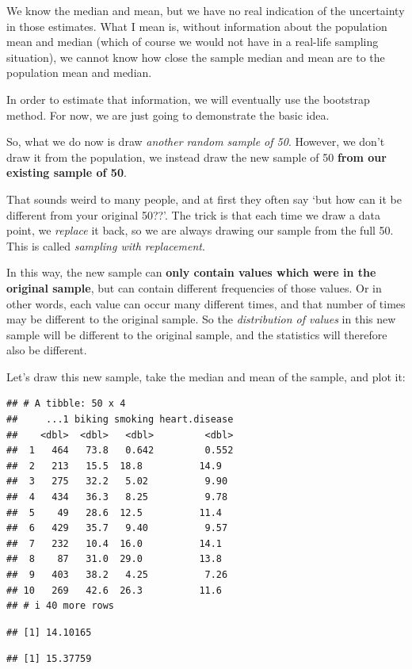 \documentclass[
]{book}
\begin{document}
We know the median and mean, but we have no real indication of the uncertainty in those estimates. What I mean is, without information about the population mean and median (which of course we would not have in a real-life sampling situation), we cannot know how close the sample median and mean are to the population mean and median.

In order to estimate that information, we will eventually use the bootstrap method. For now, we are just going to demonstrate the basic idea.

So, what we do now is draw \emph{another random sample of 50}. However, we don't draw it from the population, we instead draw the new sample of 50 \textbf{from our existing sample of 50}.

That sounds weird to many people, and at first they often say `but how can it be different from your original 50??'. The trick is that each time we draw a data point, we \emph{replace} it back, so we are always drawing our sample from the full 50. This is called \emph{sampling with replacement}.

In this way, the new sample can \textbf{only contain values which were in the original sample}, but can contain different frequencies of those values. Or in other words, each value can occur many different times, and that number of times may be different to the original sample. So the \emph{distribution of values} in this new sample will be different to the original sample, and the statistics will therefore also be different.

Let's draw this new sample, take the median and mean of the sample, and plot it:

\begin{verbatim}
## # A tibble: 50 x 4
##     ...1 biking smoking heart.disease
##    <dbl>  <dbl>   <dbl>         <dbl>
##  1   464   73.8   0.642         0.552
##  2   213   15.5  18.8          14.9  
##  3   275   32.2   5.02          9.90 
##  4   434   36.3   8.25          9.78 
##  5    49   28.6  12.5          11.4  
##  6   429   35.7   9.40          9.57 
##  7   232   10.4  16.0          14.1  
##  8    87   31.0  29.0          13.8  
##  9   403   38.2   4.25          7.26 
## 10   269   42.6  26.3          11.6  
## # i 40 more rows
\end{verbatim}

\begin{verbatim}
## [1] 14.10165
\end{verbatim}

\begin{verbatim}
## [1] 15.37759
\end{verbatim}
\end{document}
